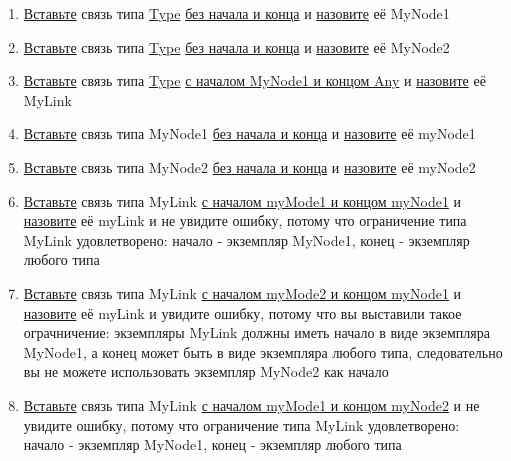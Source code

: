 \begin{enumerate}
      \item \hyperlink{DeepCase.InsertLink.Description}{Вставьте} связь типа
            \hyperlink{Core.Type.Description}{Type}
            \hyperlink{FAQ.HowToInsertLinkWithoutFromAndTo}{без
                  начала и конца} и \hyperlink{FAQ.HowToSetName}{назовите} её
            MyNode1
      \item \hyperlink{DeepCase.InsertLink.Description}{Вставьте} связь типа
            \hyperlink{Core.Type.Description}{Type}
            \hyperlink{FAQ.HowToInsertLinkWithoutFromAndTo}{без
                  начала и конца} и \hyperlink{FAQ.HowToSetName}{назовите} её
            MyNode2
      \item \hyperlink{DeepCase.InsertLink.Description}{Вставьте} связь типа
            \hyperlink{Core.Type.Description}{Type}
            \hyperlink{FAQ.HowToInsertLinkWithFromAndTo}{с
                  началом MyNode1 и концом Any} и
            \hyperlink{FAQ.HowToSetName}{назовите} её
            MyLink
      \item \hyperlink{DeepCase.InsertLink.Description}{Вставьте} связь типа
            MyNode1
            \hyperlink{FAQ.HowToInsertLinkWithoutFromAndTo}{без начала и конца}
            и
            \hyperlink{FAQ.HowToSetName}{назовите} её myNode1
      \item \hyperlink{DeepCase.InsertLink.Description}{Вставьте} связь типа
            MyNode2
            \hyperlink{FAQ.HowToInsertLinkWithoutFromAndTo}{без начала и конца}
            и
            \hyperlink{FAQ.HowToSetName}{назовите} её myNode2
      \item \hyperlink{DeepCase.InsertLink.Description}{Вставьте} связь типа
            MyLink
            \hyperlink{FAQ.HowToInsertLinkWithFromAndTo}{с началом myMode1 и
                  концом
                  myNode1} и \hyperlink{FAQ.HowToSetName}{назовите} её myLink и
            не
            увидите
            ошибку, потому что ограничение типа MyLink удовлетворено: начало -
            экземпляр
            MyNode1, конец - экземпляр любого типа
      \item \hyperlink{DeepCase.InsertLink.Description}{Вставьте} связь типа
            MyLink
            \hyperlink{FAQ.HowToInsertLinkWithFromAndTo}{с началом myMode2 и
                  концом
                  myNode1} и \hyperlink{FAQ.HowToSetName}{назовите} её myLink и
            увидите
            ошибку,
            потому что вы выставили такое ограчничение: экземпляры MyLink
            должны
            иметь
            начало в виде экземпляра MyNode1, а конец может быть в виде
            экземпляра
            любого
            типа, следовательно вы не можете использовать экземпляр MyNode2 как
            начало
      \item \hyperlink{DeepCase.InsertLink.Description}{Вставьте} связь типа
            MyLink
            \hyperlink{FAQ.HowToInsertLinkWithFromAndTo}{с началом myMode1 и
                  концом
                  myNode2} и не увидите ошибку, потому что ограничение типа
            MyLink
            удовлетворено:
            начало - экземпляр MyNode1, конец - экземпляр любого типа
\end{enumerate}

